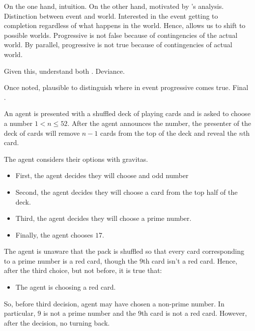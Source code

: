 \begin{note}
  On the one hand, intuition.
  On the other hand, motivated by \citeauthor{Landman:1992wh}'s analysis.
  Distinction between event and world.
  Interested in the event getting to completion regardless of what happens in the world.
  Hence, allows us to shift to possible worlds.
  Progressive is not false because of contingencies of the actual world.
  By parallel, progressive is not true because of contingencies of actual world.
\end{note}

\begin{note}
  Given this, understand both .
  Deviance.

  Once noted, plausible to distinguish where in event progressive comes true.
  Final \illu{}.
  \begin{illustration}
    An agent is presented with a shuffled deck of playing cards and is asked to choose a number \(1 < n \leq 52\).
    After the agent announces the number, the presenter of the deck of cards will remove \(n - 1\) cards from the top of the deck and reveal the \(n\)th card.

    The agent considers their options with gravitas.
    \begin{itemize}
    \item
      First, the agent decides they will choose and odd number
    \item
      Second, the agent decides they will choose a card from the top half of the deck.
    \item
      Third, the agent decides they will choose a prime number.
    \item
      Finally, the agent chooses \(17\).
    \end{itemize}
    The agent is unaware that the pack is shuffled so that every card corresponding to a prime number is a red card, though the \(9\)th card isn't a red card.
    Hence, after the third choice, but not before, it is true that:
    \begin{itemize}
    \item
      The agent is choosing a red card.
    \end{itemize}
    \vspace{-\baselineskip}
  \end{illustration}
  So, before third decision, agent may have chosen a non-prime number.
  In particular, \(9\) is not a prime number and the \(9\)th card is not a red card.
  However, after the decision, no turning back.
\end{note}

